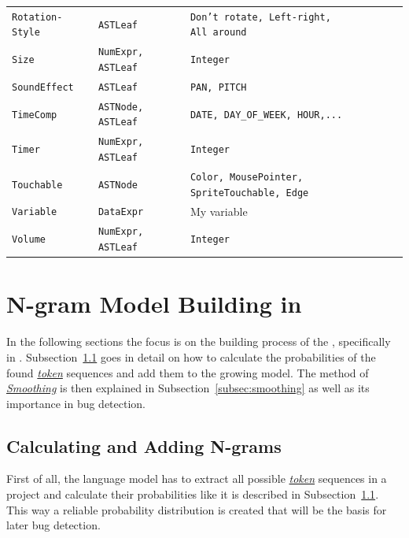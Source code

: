\begin{table}[H]
\begin{tabular}[t]{lll}
   		\texttt{Rotation-Style} & \texttt{ASTLeaf} & \parbox[t]{7cm}{\texttt{Don't rotate, Left-right,\\ All around}} \\
   		\vspace{10pt}
    		\texttt{Size} & \texttt{NumExpr, ASTLeaf} & \texttt{Integer} \\
    		\vspace{10pt}
    		\texttt{SoundEffect} & \texttt{ASTLeaf} & \texttt{PAN, PITCH} \\
    		\vspace{10pt}
    		\texttt{TimeComp} & \texttt{ASTNode, ASTLeaf} & \texttt{DATE, DAY\_OF\_WEEK, HOUR,...} \\
    		\vspace{10pt}
    		\texttt{Timer} & \texttt{NumExpr, ASTLeaf} & \texttt{Integer} \\
    		\vspace{10pt} 
    		\texttt{Touchable} & \texttt{ASTNode} & \parbox[t]{7cm}{\texttt{Color, MousePointer, SpriteTouchable, Edge}} \\
    		\vspace{10pt}
    		\texttt{Variable} & \texttt{DataExpr} & My variable \\ 
    		\vspace{10pt}
        \texttt{Volume} & \texttt{NumExpr, ASTLeaf} & \texttt{Integer} \\     
    \bottomrule
    \end{tabular}
\end{table}


\section{N-gram Model Building in \scratch{}}\label{sec:model}
In the following sections the focus is on the building process of the \ngram{}, specifically in \scratch{}. Subsection~\ref{subsec:n-grams} goes in detail on how to calculate the probabilities of the found  \hyperref[def:token]{\textit{token}} sequences and add them to the growing model. The method of \hyperref[def:smoothing]{\textit{Smoothing}} is then explained in Subsection~\ref{subsec:smoothing} as well as its importance in bug detection.

\subsection{Calculating and Adding N-grams}\label{subsec:n-grams}
First of all, the language model has to extract all possible  \hyperref[def:token]{\textit{token}} sequences in a \scratch{} project and calculate their probabilities like it is described in Subsection~\ref{subsec:n-grams}. This way a reliable probability distribution is created that will be the basis for later bug detection. 

